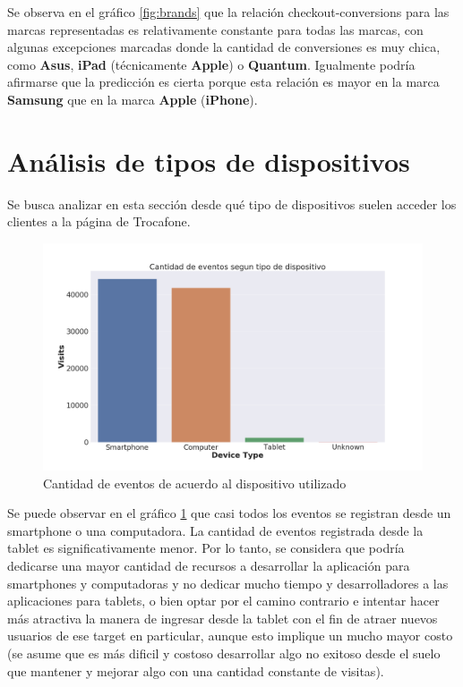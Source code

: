 \documentclass[a4paper]{article}
\begin{document}
Se observa en el gráfico \ref{fig:brands} que la relación checkout-conversions para las marcas representadas es relativamente constante para todas las marcas, con algunas excepciones marcadas donde la cantidad de conversiones es muy chica, como \textbf{Asus}, \textbf{iPad} (técnicamente \textbf{Apple}) o \textbf{Quantum}. Igualmente podría afirmarse que la predicción es cierta porque esta relación es mayor en la marca \textbf{Samsung} que en la marca \textbf{Apple} (\textbf{iPhone}).

\section{Análisis de tipos de dispositivos}

Se busca analizar en esta sección desde qué tipo de dispositivos suelen acceder los clientes a la página de Trocafone.

\begin{figure}[h!]
	\includegraphics[width=\linewidth]{figures/150-eventos_tipo-barplot.png}
	\caption{Cantidad de eventos de acuerdo al dispositivo utilizado}
	\label{fig:dispositivos}
\end{figure}

Se puede observar en el gráfico \ref{fig:dispositivos} que casi todos los eventos se registran desde un smartphone o una computadora. La cantidad de eventos registrada desde la tablet es significativamente menor. Por lo tanto, se considera que podría dedicarse una mayor cantidad de recursos a desarrollar la aplicación para smartphones y computadoras y no dedicar mucho tiempo y desarrolladores a las aplicaciones para tablets, o bien optar por el camino contrario e intentar hacer más atractiva la manera de ingresar desde la tablet con el fin de atraer nuevos usuarios de ese target en particular, aunque esto implique un mucho mayor costo (se asume que es más dificil y costoso desarrollar algo no exitoso desde el suelo que mantener y mejorar algo con una cantidad constante de visitas).
\end{document}
